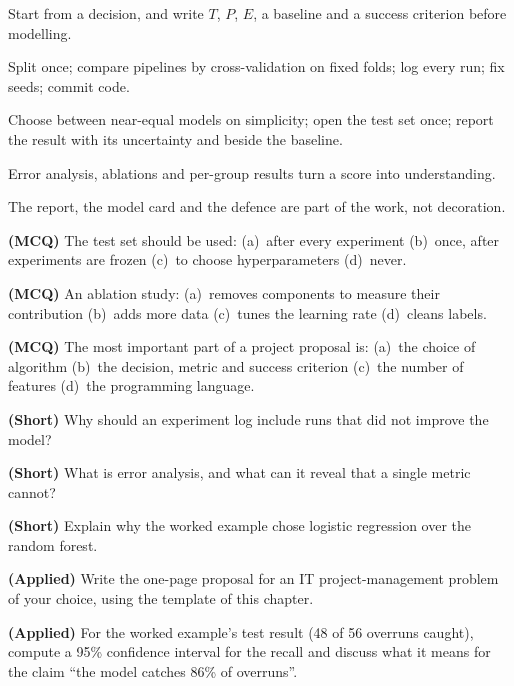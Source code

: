 \begin{chaptersummary}
\begin{tight}
  \item Start from a decision, and write $T$, $P$, $E$, a baseline and a success
        criterion before modelling.
  \item Split once; compare pipelines by cross-validation on fixed folds; log every
        run; fix seeds; commit code.
  \item Choose between near-equal models on simplicity; open the test set once;
        report the result with its uncertainty and beside the baseline.
  \item Error analysis, ablations and per-group results turn a score into
        understanding.
  \item The report, the model card and the defence are part of the work, not
        decoration.
\end{tight}
\end{chaptersummary}

\begin{reviewq}
  \item \textbf{(MCQ)} The test set should be used: (a)~after every experiment
        (b)~once, after experiments are frozen (c)~to choose hyperparameters
        (d)~never.
  \item \textbf{(MCQ)} An ablation study: (a)~removes components to measure their
        contribution (b)~adds more data (c)~tunes the learning rate (d)~cleans labels.
  \item \textbf{(MCQ)} The most important part of a project proposal is: (a)~the
        choice of algorithm (b)~the decision, metric and success criterion (c)~the
        number of features (d)~the programming language.
  \item \textbf{(Short)} Why should an experiment log include runs that did not
        improve the model?
  \item \textbf{(Short)} What is error analysis, and what can it reveal that a single
        metric cannot?
  \item \textbf{(Short)} Explain why the worked example chose logistic regression over
        the random forest.
  \item \textbf{(Applied)} Write the one-page proposal for an IT project-management
        problem of your choice, using the template of this chapter.
  \item \textbf{(Applied)} For the worked example's test result (48 of 56 overruns
        caught), compute a 95\% confidence interval for the recall and discuss what
        it means for the claim ``the model catches 86\% of overruns''.
\end{reviewq}
